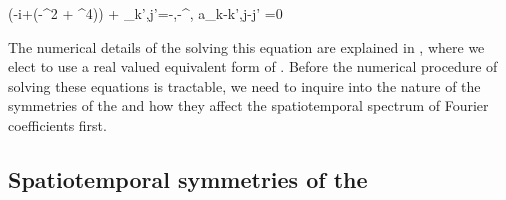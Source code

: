 \beq \label{eqn:SpacetimeFourier}
(-i\omegaj +(-\wavek^2 + \wavek^4)) \akj
+ \sum_{k',j'=-\inf,-\inf}^{\inf,\inf}\akj
a_{k-k',j-j'}
=0
\eeq

The numerical details of the solving this equation are explained in , where
we elect to use a real valued equivalent form of . Before the numerical
procedure of solving these equations is tractable, we need to inquire into the nature of the symmetries
of the \KSe and how they affect the spatiotemporal spectrum of Fourier coefficients first.

\subsection{Spatiotemporal symmetries of the \KSe}
\label{sect:KSsymm}


%
%
%

\printbibliography[heading=subbibintoc,title={References}]
